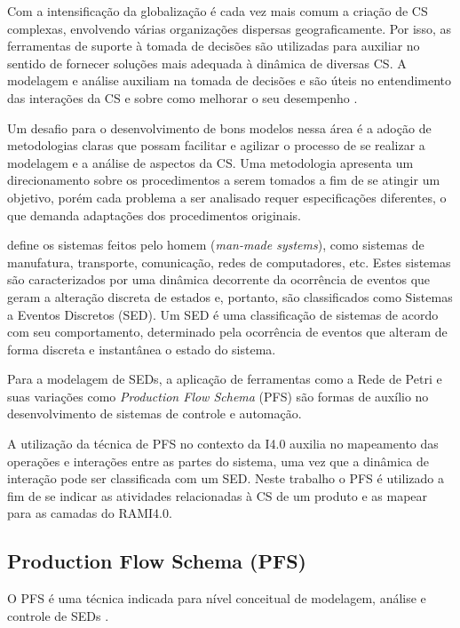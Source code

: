 Com a intensificação da globalização é cada vez mais comum a criação de CS complexas, envolvendo várias organizações dispersas geograficamente. Por isso, as ferramentas de suporte à tomada de decisões são utilizadas para auxiliar no sentido de fornecer soluções mais adequada à dinâmica de diversas CS. A modelagem e análise auxiliam na tomada de decisões e são úteis no entendimento das interações da CS e sobre como melhorar o seu desempenho \cite{oliveira2016supplychain}.

Um desafio para o desenvolvimento de bons modelos nessa área é a adoção de metodologias claras que possam facilitar e agilizar o processo de se realizar a modelagem e a análise de aspectos da CS. Uma metodologia apresenta um direcionamento sobre os procedimentos a serem tomados a fim de se atingir um objetivo, porém cada problema a ser analisado requer especificações diferentes, o que demanda adaptações dos procedimentos originais.

 define os sistemas feitos pelo homem (\textit{man-made systems}), como sistemas de manufatura, transporte, comunicação, redes de computadores, etc. Estes sistemas são caracterizados por uma dinâmica decorrente da ocorrência de eventos que geram a alteração discreta de estados e, portanto, são classificados como Sistemas a Eventos Discretos (SED). Um SED é uma classificação de sistemas de acordo com seu comportamento, determinado pela ocorrência de eventos que alteram de forma discreta e instantânea o estado do sistema.

Para a modelagem de SEDs, a aplicação de ferramentas como a Rede de Petri e suas variações como \textit{Production Flow Schema} (PFS) são formas de auxílio no desenvolvimento de sistemas de controle e automação.

A utilização da técnica de PFS no contexto da I4.0 auxilia no mapeamento das operações e interações entre as partes do sistema, uma vez que a dinâmica de interação pode ser classificada com um SED. Neste trabalho o PFS é utilizado a fim de se indicar as atividades relacionadas à CS de um produto e as mapear para as camadas do RAMI4.0.

\subsection{Production Flow Schema (PFS)}

O PFS é uma técnica indicada para nível conceitual de modelagem, análise e controle de SEDs \cite{miyagi1996controle}.

